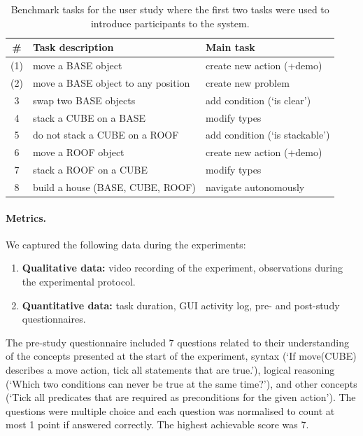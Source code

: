 \begin{table}[h]
	\centering
	\caption{Benchmark tasks for the user study where the first two tasks were used to introduce participants to the system.}
	\label{table:userstudytasks}
	\begin{center}
		\begin{tabular}{cll}
			\# &Task description & Main task \\ \hline
			(1)& move a BASE object & create new action (+demo) \\
			(2)& move a BASE object to any position & create new problem \\
			3 &swap two BASE objects & add condition (`is clear') \\
			4 &stack a CUBE on a BASE & modify types\\
			5 &do not stack a CUBE on a ROOF & add condition (`is stackable')\\
			6 &move a ROOF object & create new action (+demo) \\
			7 &stack a ROOF on a CUBE & modify types  \\
			8 &build a house (BASE, CUBE, ROOF) & navigate autonomously \\ \hline
		\end{tabular}
	\end{center}
\end{table}

\paragraph*{Metrics.}
We captured the following data during the experiments:
\begin{enumerate}
    \item \textbf{Qualitative data:} video recording of the experiment, observations during the experimental protocol.
    \item \textbf{Quantitative data:} task duration, GUI activity log, pre- and post-study questionnaires.
\end{enumerate}

The pre-study questionnaire included 7 questions related to their understanding of the concepts presented at the start of the experiment, \eg syntax (`If move(CUBE) describes a move action, tick all statements that are true.'), logical reasoning 
(`Which two conditions can never be true at the same time?'), and other concepts (`Tick all predicates that are required as preconditions for the given action').
The questions were multiple choice and each question was normalised to count at most 1 point if answered correctly.
The highest achievable score was 7.

